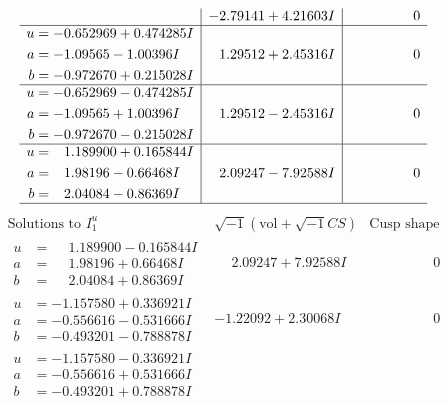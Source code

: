 \documentclass[1p]{elsarticle_modified}
\theoremstyle{definition}
\newcommand{\I}{\sqrt{-1}}
\begin{document}
$$\begin{array}{c|c|c}
 & -2.79141 + 4.21603 I & \phantom{-0.000000 } 0 \\ \hline\begin{aligned}
u &= -0.652969 + 0.474285 I \\
a &= -1.09565 - 1.00396 I \\
b &= -0.972670 + 0.215028 I\end{aligned}
 & \phantom{-}1.29512 + 2.45316 I & \phantom{-0.000000 } 0 \\ \hline\begin{aligned}
u &= -0.652969 - 0.474285 I \\
a &= -1.09565 + 1.00396 I \\
b &= -0.972670 - 0.215028 I\end{aligned}
 & \phantom{-}1.29512 - 2.45316 I & \phantom{-0.000000 } 0 \\ \hline\begin{aligned}
u &= \phantom{-}1.189900 + 0.165844 I \\
a &= \phantom{-}1.98196 - 0.66468 I \\
b &= \phantom{-}2.04084 - 0.86369 I\end{aligned}
 & \phantom{-}2.09247 - 7.92588 I & \phantom{-0.000000 } 0\\
 \hline 
 \end{array}$$\newpage$$\begin{array}{c|c|c}  
\text{Solutions to }I^u_{1}& \I (\text{vol} + \sqrt{-1}CS) & \text{Cusp shape}\\
 \hline 
\begin{aligned}
u &= \phantom{-}1.189900 - 0.165844 I \\
a &= \phantom{-}1.98196 + 0.66468 I \\
b &= \phantom{-}2.04084 + 0.86369 I\end{aligned}
 & \phantom{-}2.09247 + 7.92588 I & \phantom{-0.000000 } 0 \\ \hline\begin{aligned}
u &= -1.157580 + 0.336921 I \\
a &= -0.556616 - 0.531666 I \\
b &= -0.493201 - 0.788878 I\end{aligned}
 & -1.22092 + 2.30068 I & \phantom{-0.000000 } 0 \\ \hline\begin{aligned}
u &= -1.157580 - 0.336921 I \\
a &= -0.556616 + 0.531666 I \\
b &= -0.493201 + 0.788878 I\end{aligned}

\end{array}$$
\end{document}
